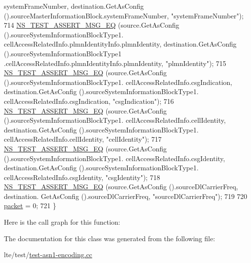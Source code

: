 \begin{DoxyCode}
      systemFrameNumber, destination.GetAsConfig ().sourceMasterInformationBlock.systemFrameNumber, \textcolor{stringliteral}{"systemFrameNumber"});
714   \hyperlink{group__testing_ga2a9d78cffb3db8e867c35fff0b698cf5}{NS\_TEST\_ASSERT\_MSG\_EQ} (source.GetAsConfig ().sourceSystemInformationBlockType1.
      cellAccessRelatedInfo.plmnIdentityInfo.plmnIdentity, destination.GetAsConfig ().sourceSystemInformationBlockType1
      .cellAccessRelatedInfo.plmnIdentityInfo.plmnIdentity, \textcolor{stringliteral}{"plmnIdentity"});
715   \hyperlink{group__testing_ga2a9d78cffb3db8e867c35fff0b698cf5}{NS\_TEST\_ASSERT\_MSG\_EQ} (source.GetAsConfig ().sourceSystemInformationBlockType1.
      cellAccessRelatedInfo.csgIndication, destination.GetAsConfig ().sourceSystemInformationBlockType1.
      cellAccessRelatedInfo.csgIndication, \textcolor{stringliteral}{"csgIndication"});
716   \hyperlink{group__testing_ga2a9d78cffb3db8e867c35fff0b698cf5}{NS\_TEST\_ASSERT\_MSG\_EQ} (source.GetAsConfig ().sourceSystemInformationBlockType1.
      cellAccessRelatedInfo.cellIdentity, destination.GetAsConfig ().sourceSystemInformationBlockType1.
      cellAccessRelatedInfo.cellIdentity, \textcolor{stringliteral}{"cellIdentity"});
717   \hyperlink{group__testing_ga2a9d78cffb3db8e867c35fff0b698cf5}{NS\_TEST\_ASSERT\_MSG\_EQ} (source.GetAsConfig ().sourceSystemInformationBlockType1.
      cellAccessRelatedInfo.csgIdentity, destination.GetAsConfig ().sourceSystemInformationBlockType1.
      cellAccessRelatedInfo.csgIdentity, \textcolor{stringliteral}{"csgIdentity"});
718   \hyperlink{group__testing_ga2a9d78cffb3db8e867c35fff0b698cf5}{NS\_TEST\_ASSERT\_MSG\_EQ} (source.GetAsConfig ().sourceDlCarrierFreq, destination.
      GetAsConfig ().sourceDlCarrierFreq, \textcolor{stringliteral}{"sourceDlCarrierFreq"});
719 
720   \hyperlink{classRrcHeaderTestCase_a6f0748c0e845f797497fbda1ca781803}{packet} = 0;
721 \}
\end{DoxyCode}


Here is the call graph for this function\+:




The documentation for this class was generated from the following file\+:\begin{DoxyCompactItemize}
\item 
lte/test/\hyperlink{test-asn1-encoding_8cc}{test-\/asn1-\/encoding.\+cc}\end{DoxyCompactItemize}
